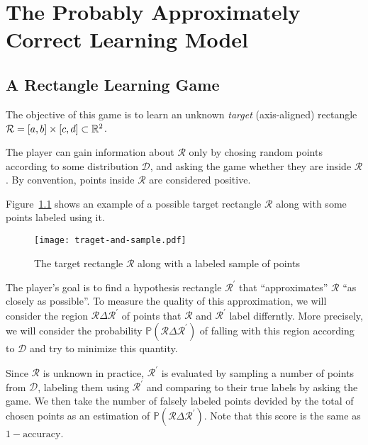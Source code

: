 \chapter{The Probably Approximately Correct Learning Model}
    \section{A Rectangle Learning Game}
    \newcommand{\rectangle}{\mathcal{R}}
    The objective of this game is to learn an unknown \emph{target} (axis-aligned) rectangle \(\rectangle = [a, b] \times [c, d] \subset \reals^2\).

    The player can gain information about \(\rectangle\) only by chosing random points according to some distribution \(\mathcal{D}\), and asking the game whether they are inside \(\rectangle\). By convention, points inside \(\rectangle\) are considered positive.

    Figure~\ref{fig:traget-and-sample} shows an example of a possible target rectangle \(\rectangle\) along with some points labeled using it.

    \begin{figure}
        \begin{center}
            \texttt{[image: traget-and-sample.pdf]}
        \end{center}
        \caption{The target rectangle \(\rectangle\) along with a labeled sample of points}
        \label{fig:traget-and-sample}
    \end{figure}
    
    The player's goal is to find a hypothesis rectangle \(\rectangle^\prime\) that ``approximates'' \(\rectangle\) ``as closely as possible''. To measure the quality of this approximation, we will consider the region \(\rectangle\Delta\rectangle^\prime\) of points that \(\rectangle\) and \(\rectangle^\prime\) label differntly. More precisely, we will consider the probability \(\mathbb{P}(\rectangle\Delta\rectangle^\prime)\) of falling with this region according to \(\mathcal{D}\) and try to minimize this quantity.

    Since \(\rectangle\) is unknown in practice, \(\rectangle^\prime\) is evaluated by sampling a number of points from \(\mathcal{D}\), labeling them using \(\rectangle^\prime\) and comparing to their true labels by asking the game. We then take the number of falsely labeled points devided by the total of chosen points as an estimation of \(\mathbb{P}(\rectangle\Delta\rectangle^\prime)\).
    Note that this score is the same as \(1 - \mathrm{accuracy}\).

